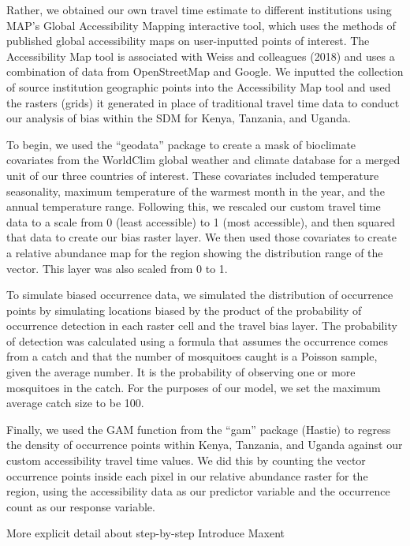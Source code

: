 \documentclass[sn-nature]{sn-jnl}%
\begin{document}
Rather, we obtained our own travel time estimate to different institutions using MAP’s Global Accessibility Mapping interactive tool, which uses the methods of published global accessibility maps on user-inputted points of interest. The Accessibility Map tool is associated with Weiss and colleagues (2018) and uses a combination of data from OpenStreetMap and Google. We inputted the collection of source institution geographic points into the Accessibility Map tool and used the rasters (grids) it generated in place of traditional travel time data to conduct our analysis of bias within the SDM for Kenya, Tanzania, and Uganda.

To begin, we used the “geodata” package to create a mask of bioclimate covariates from the WorldClim global weather and climate database for a merged unit of our three countries of interest. These covariates included temperature seasonality, maximum temperature of the warmest month in the year, and the annual temperature range. Following this, we rescaled our custom travel time data to a scale from 0 (least accessible) to 1 (most accessible), and then squared that data to create our bias raster layer. We then used those covariates to create a relative abundance map for the region showing the distribution range of the vector. This layer was also scaled from 0 to 1. 

To simulate biased occurrence data, we simulated the distribution of occurrence points by
simulating locations biased by the product of the probability of occurrence detection in each raster cell and the travel bias layer. The probability of detection was calculated using a formula that assumes the occurrence comes from a catch and that the number of mosquitoes caught is a Poisson sample, given the average number. It is the probability of observing one or more mosquitoes in the catch. For the purposes of our model, we set the maximum average catch size to be 100. 

Finally, we used the GAM function from the “gam” package (Hastie) to regress the density of occurrence points within Kenya, Tanzania, and Uganda against our custom accessibility travel time values. We did this by counting the vector occurrence points inside each pixel in our relative abundance raster for the region, using the accessibility data as our predictor variable and the occurrence count as our response variable. 

More explicit detail about step-by-step
Introduce Maxent
\end{document}
